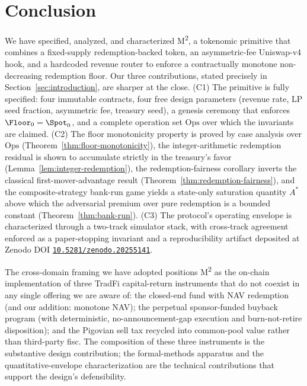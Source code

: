 \section{Conclusion}
\label{sec:conclusion}

We have specified, analyzed, and characterized M\textsuperscript{2}, a tokenomic primitive that combines a fixed-supply redemption-backed token, an asymmetric-fee Uniswap-v4 hook, and a hardcoded revenue router to enforce a contractually monotone non-decreasing redemption floor. Our three contributions, stated precisely in Section~\ref{sec:introduction}, are sharper at the close. (C1) The primitive is fully specified: four immutable contracts, four free design parameters (revenue rate, LP seed fraction, asymmetric fee, treasury seed), a genesis ceremony that enforces $\Floor_0 = \Spot_0$, and a complete operation set $\mathrm{Ops}$ over which the invariants are claimed. (C2) The floor monotonicity property is proved by case analysis over $\mathrm{Ops}$ (Theorem~\ref{thm:floor-monotonicity}), the integer-arithmetic redemption residual is shown to accumulate strictly in the treasury's favor (Lemma~\ref{lem:integer-redemption}), the redemption-fairness corollary inverts the classical \citet{ChenGoldsteinJiang2010} first-mover-advantage result (Theorem~\ref{thm:redemption-fairness}), and the composite-strategy bank-run game yields a state-only saturation quantity $A^*$ above which the adversarial premium over pure redemption is a bounded constant (Theorem~\ref{thm:bank-run}). (C3) The protocol's operating envelope is characterized through a two-track simulator stack, with cross-track agreement enforced as a paper-stopping invariant and a reproducibility artifact deposited at Zenodo DOI \href{https://doi.org/10.5281/zenodo.20255141}{\texttt{10.5281/zenodo.20255141}}.

The cross-domain framing we have adopted positions M\textsuperscript{2} as the on-chain implementation of three TradFi capital-return instruments that do not coexist in any single offering we are aware of: the closed-end fund with NAV redemption (and our addition: monotone NAV); the perpetual sponsor-funded buyback program (with deterministic, no-announcement-gap execution and burn-not-retire disposition); and the Pigovian sell tax recycled into common-pool value rather than third-party fisc. The composition of these three instruments is the substantive design contribution; the formal-methods apparatus and the quantitative-envelope characterization are the technical contributions that support the design's defensibility.

